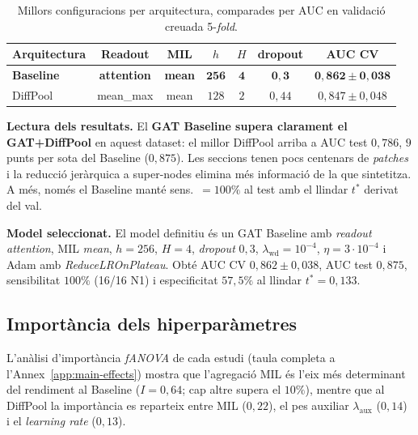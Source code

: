 \documentclass[10pt,a4paper,twocolumn,twoside]{article}
\begin{document}
\begin{table}[t]
\centering
\caption{Millors configuracions per arquitectura, comparades per AUC en validació creuada
5-\textit{fold}.}
\label{tab:configs-compare}
\small
\begin{tabular}{lcccccc}
\toprule
\textbf{Arquitectura} & \textbf{Readout} & \textbf{MIL}
  & \textbf{$h$} & \textbf{$H$} & \textbf{dropout} & \textbf{AUC CV} \\
\midrule
\textbf{Baseline}  & \textbf{attention} & \textbf{mean} & $\mathbf{256}$ & $\mathbf{4}$ & $\mathbf{0{,}3}$ & $\mathbf{0{,}862\!\pm\!0{,}038}$ \\
DiffPool           & mean\_max          & mean          & $128$          & $2$          & $0{,}44$         & $0{,}847\!\pm\!0{,}048$ \\
\bottomrule
\end{tabular}
\end{table}

\textbf{Lectura dels resultats.} El \textbf{GAT Baseline supera clarament el GAT+DiffPool}
en aquest dataset: el millor DiffPool arriba a AUC test $0{,}786$, $9$ punts per sota del
Baseline ($0{,}875$). Les seccions tenen pocs centenars de \textit{patches} i
la reducció jeràrquica a super-nodes elimina més informació de la que sintetitza. A més,
només el Baseline manté sens.\ $=100\%$ al test amb el llindar $t^*$ derivat del val.

\textbf{Model seleccionat.} El model definitiu és un GAT Baseline amb \textit{readout}
\textit{attention}, MIL \textit{mean}, $h=256$, $H=4$, \textit{dropout} $0{,}3$,
$\lambda_{\text{wd}}=10^{-4}$, $\eta=3\!\cdot\!10^{-4}$ i Adam amb \textit{ReduceLROnPlateau}.
Obté AUC CV $0{,}862\pm 0{,}038$, AUC test $0{,}875$, sensibilitat $100\%$ (16/16 N1) i
especificitat $57{,}5\%$ al llindar $t^*\!=\!0{,}133$.

\subsection{Importància dels hiperparàmetres}
\label{sec:main-effects}

L'anàlisi d'importància \textit{fANOVA} de cada estudi (taula completa a
l'Annex~\ref{app:main-effects}) mostra que l'agregació MIL és l'eix més
determinant del rendiment al Baseline ($I=0{,}64$; cap altre supera el $10\%$),
mentre que al DiffPool la importància es reparteix entre MIL ($0{,}22$), el pes
auxiliar $\lambda_{\text{aux}}$ ($0{,}14$) i el \textit{learning rate} ($0{,}13$).
\end{document}
